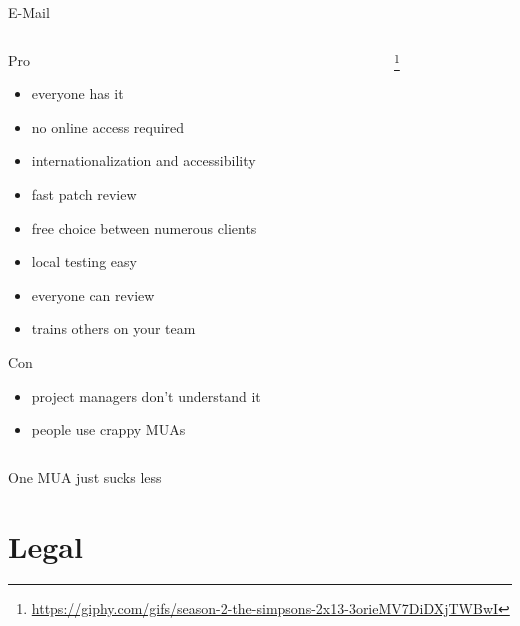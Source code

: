 \documentclass{beamer}
\begin{document}
\begin{frame}{E-Mail}
    \begin{columns}[T]
        \begin{column}{0.6\textwidth}
            \begin{exampleblock}{Pro}
                \begin{itemize}
                    \item everyone has it
                    \item no online access required
                    \item internationalization and accessibility
                    \item fast patch review
                    \item free choice between numerous clients
                    \item local testing easy
                    \item everyone can review
                    \item trains others on your team
                \end{itemize}
            \end{exampleblock}
            \begin{alertblock}{Con}
                \begin{itemize}
                    \item project managers don't understand it
                    \item people use crappy MUAs
                \end{itemize}
            \end{alertblock}
        \end{column}
        \begin{column}{0.4\textwidth}
            \footnote{\tiny\url{https://giphy.com/gifs/season-2-the-simpsons-2x13-3orieMV7DiDXjTWBwI}}
        \end{column}
    \end{columns}
\end{frame}

\begin{frame}{One MUA just sucks less}
\end{frame}

\section{Legal}
\end{document}
